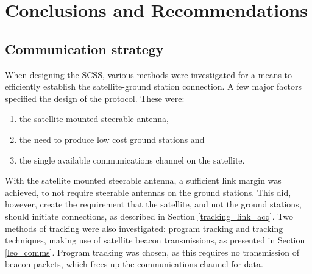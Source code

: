 \chapter{Conclusions and Recommendations}
\label{chp:CONC}




%
%
%

\section{Communication strategy}
\label{comms_strategy}

When designing the SCSS, various methods were investigated for a means to efficiently establish
the satellite-ground station connection. A few major factors specified the design of the protocol.
These were:
%
\begin{enumerate}
\item the satellite mounted steerable antenna,
\item the need to produce low cost ground stations and
\item the single available communications channel on the satellite.
\end{enumerate}

With the satellite mounted steerable antenna, a sufficient link margin was achieved, to not require steerable
antennas on the ground stations. This did, however, create the requirement that the satellite, and not the
ground stations, should initiate connections, as described in Section \ref{tracking_link_acq}. Two methods
of tracking were also investigated: program tracking and tracking techniques, making use of satellite beacon
transmissions, as presented in Section \ref{leo_comms}. Program tracking was chosen, as this requires
no transmission of beacon packets, which frees up the communications channel for data.

